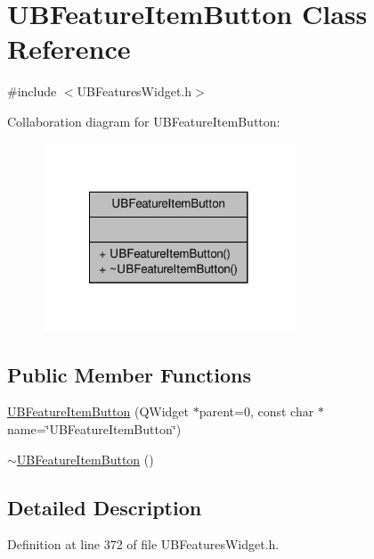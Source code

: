 \hypertarget{class_u_b_feature_item_button}{\section{U\-B\-Feature\-Item\-Button Class Reference}
\label{d6/d5d/class_u_b_feature_item_button}
}


{\ttfamily \#include $<$U\-B\-Features\-Widget.\-h$>$}



Collaboration diagram for U\-B\-Feature\-Item\-Button\-:
\nopagebreak
\begin{figure}[H]
\begin{center}
\leavevmode
\includegraphics[width=212pt]{d7/db3/class_u_b_feature_item_button__coll__graph}
\end{center}
\end{figure}
\subsection*{Public Member Functions}
\begin{DoxyCompactItemize}
\item 
\hyperlink{class_u_b_feature_item_button_ae283cef9530ed6b4655199f0703d5cdf}{U\-B\-Feature\-Item\-Button} (Q\-Widget $\ast$parent=0, const char $\ast$name=\char`\"{}U\-B\-Feature\-Item\-Button\char`\"{})
\item 
\hyperlink{class_u_b_feature_item_button_a71f24d07c2b4c4ae767bfd53df9e685b}{$\sim$\-U\-B\-Feature\-Item\-Button} ()
\end{DoxyCompactItemize}


\subsection{Detailed Description}


Definition at line 372 of file U\-B\-Features\-Widget.\-h.



